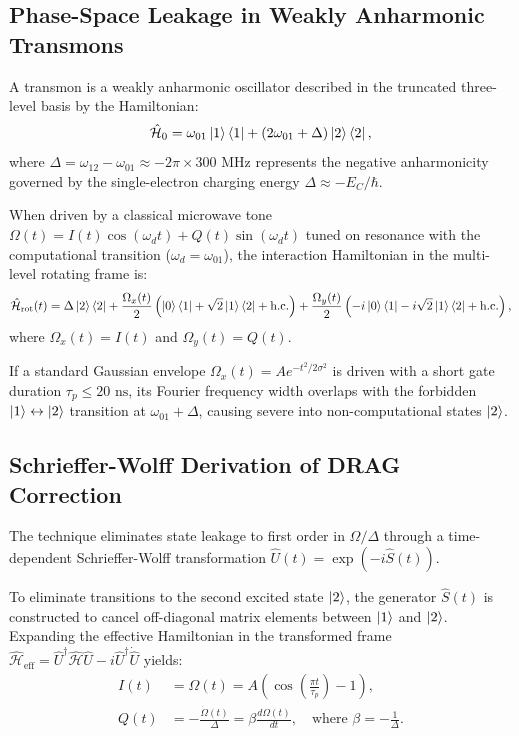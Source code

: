 \subsection{Phase-Space Leakage in Weakly Anharmonic Transmons}
A transmon is a weakly anharmonic oscillator described in the truncated three-level basis by the Hamiltonian:
\begin{equation}
    \hat{\mathcal{H}}_0 = \omega_{01} \ket{1}\bra{1} + (2\omega_{01} + \Delta) \ket{2}\bra{2},
    \label{eq:transmon_3level_hamiltonian_ch12}
\end{equation}
where $\Delta = \omega_{12} - \omega_{01} \approx -2\pi \times 300\text{ MHz}$ represents the negative anharmonicity governed by the single-electron charging energy $\Delta \approx -E_C / \hbar$.

When driven by a classical microwave tone $\Omega(t) = I(t)\cos(\omega_d t) + Q(t)\sin(\omega_d t)$ tuned on resonance with the computational transition ($\omega_d = \omega_{01}$), the interaction Hamiltonian in the multi-level rotating frame is:
\begin{equation}
    \hat{\mathcal{H}}_{\text{rot}}(t) = \Delta \ket{2}\bra{2} + \frac{\Omega_x(t)}{2}\left( \ket{0}\bra{1} + \sqrt{2}\ket{1}\bra{2} + \text{h.c.} \right) + \frac{\Omega_y(t)}{2}\left( -i\ket{0}\bra{1} - i\sqrt{2}\ket{1}\bra{2} + \text{h.c.} \right),
    \label{eq:transmon_rotating_interaction_hamiltonian}
\end{equation}
where $\Omega_x(t) = I(t)$ and $\Omega_y(t) = Q(t)$.

If a standard Gaussian envelope $\Omega_x(t) = A e^{-t^2 / 2\sigma^2}$ is driven with a short gate duration $\tau_p \le 20\text{ ns}$, its Fourier frequency width overlaps with the forbidden $\ket{1} \leftrightarrow \ket{2}$ transition at $\omega_{01} + \Delta$, causing severe  into non-computational states $\ket{2}$.

\subsection{Schrieffer-Wolff Derivation of DRAG Correction}
The  technique eliminates state leakage to first order in $\Omega / \Delta$ through a time-dependent Schrieffer-Wolff transformation $\hat{U}(t) = \exp(-i\hat{S}(t))$.

To eliminate transitions to the second excited state $\ket{2}$, the generator $\hat{S}(t)$ is constructed to cancel off-diagonal matrix elements between $\ket{1}$ and $\ket{2}$. Expanding the effective Hamiltonian in the transformed frame $\hat{\mathcal{H}}_{\text{eff}} = \hat{U}^\dagger \hat{\mathcal{H}} \hat{U} - i\hat{U}^\dagger \dot{\hat{U}}$ yields:
\begin{align}
    I(t) &= \Omega(t) = A \left( \cos\left(\frac{\pi t}{\tau_p}\right) - 1 \right), \label{eq:drag_in_phase_ch12} \\
    Q(t) &= -\frac{\dot{\Omega}(t)}{\Delta} = \beta \frac{d\Omega(t)}{dt}, \quad \text{where } \beta = -\frac{1}{\Delta}. \label{eq:drag_quadrature_ch12}
\end{align}

